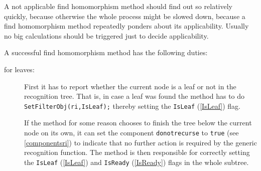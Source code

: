 \documentclass[a4paper,11pt]{report}
\begin{document}
{{ A not applicable find homomorphism method should find out so relatively
quickly, because otherwise the whole process might be slowed down, because a
find homomorphism method repeatedly ponders about its applicability. Usually
no big calculations should be triggered just to decide applicability.

 A successful find homomorphism method has the following duties: 
\begin{description}
\item[{for leaves:}] First it has to report whether the current node is a leaf or not in the
recognition tree. That is, in case a leaf was found the method has to do \texttt{SetFilterObj(ri,IsLeaf);} thereby setting the \texttt{IsLeaf} (\ref{IsLeaf}) flag. 

 If the method for some reason chooses to finish the tree below the current
node on its own, it can set the component \texttt{donotrecurse} to \texttt{true} (see \ref{componentsri}) to indicate that no further action is required by the generic recognition
function. The method is then responsible for correctly setting the \texttt{IsLeaf} (\ref{IsLeaf}) and \texttt{IsReady} (\ref{IsReady}) flags in the whole subtree. 


\end{description}}}
\end{document}
